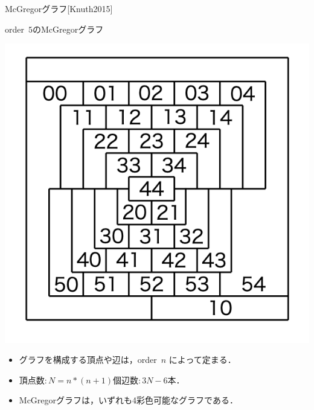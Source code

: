 \documentclass[dvipdfmx,11pt]{beamer}
\begin{document}
\begin{frame}{McGregorグラフ[Knuth2015]\cite{Knuth:TAOCP:SAT}}
 \begin{exampleblock}{order~$5$のMcGregorグラフ}
  \begin{center}
   \includegraphics[scale=0.2]{fig/order5.png}
  \end{center}
 \end{exampleblock}

 \begin{itemize}
  \item グラフを構成する頂点や辺は，order~$n$ によって定まる．
  \item 頂点数:\,$N=n*(n+1)$個\quad 辺数:\,$3N-6$本．

  \item McGregorグラフは，いずれも4彩色可能なグラフである．
 \end{itemize}
 
\end{frame}
\end{document}
